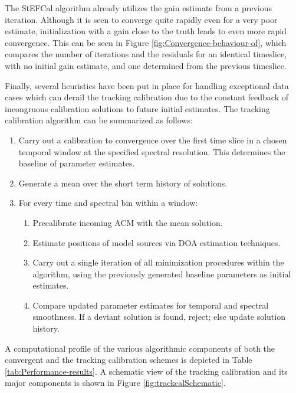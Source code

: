 \documentclass{aa}
\begin{document}
The  StEFCal  algorithm already  utilizes  the  gain  estimate from  a  previous
iteration. Although  it is seen to converge  quite rapidly even for  a very poor
estimate, initialization with a gain close to the truth leads to even more rapid
convergence.   This can  be seen  in  Figure \ref{fig:Convergence-behaviour-of},
which  compares the  number of  iterations and  the residuals  for  an identical
timeslice, with no  initial gain estimate, and one  determined from the previous
timeslice.

Finally, several heuristics have been put in place for handling exceptional data
cases which can derail the tracking  calibration due to the constant feedback of
incongruous  calibration solutions  to future  initial estimates.   The tracking
calibration algorithm can be summarized as follows:
\begin{enumerate}
\item Carry  out a  calibration to convergence  over the  first time slice  in a
  chosen temporal  window at the specified spectral  resolution. This determines
  the baseline of parameter estimates.
\item Generate a mean over the short term history of solutions.
\item For every time and spectral bin within a window:
  \begin{enumerate}
    \item Precalibrate incoming ACM with the mean solution.
    \item Estimate positions of model sources via DOA estimation techniques.
    \item Carry out a single iteration of all minimization procedures within the
      algorithm, using  the previously generated baseline  parameters as initial
      estimates.
    \item  Compare  updated  parameter   estimates  for  temporal  and  spectral
      smoothness.  If a deviant solution  is found, reject; else update solution
      history.
  \end{enumerate}
\end{enumerate}
A  computational profile  of  the  various algorithmic  components  of both  the
convergent  and   the  tracking  calibration   schemes  is  depicted   in  Table
\ref{tab:Performance-results}. A  schematic view of  the tracking calibration  and its
major          components          is          shown          in          Figure
\textcolor{black}{\ref{fig:trackcalSchematic}.}
\end{document}

